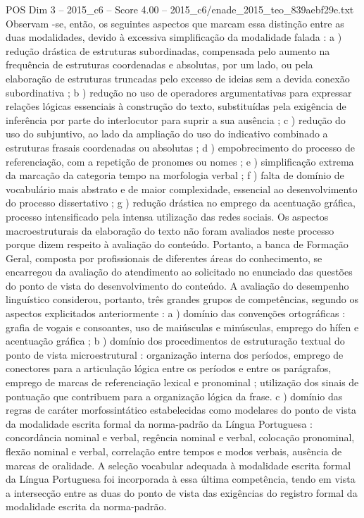 \begin{textsample}{POS Dim 3 – 2015\_c6 – Score 4.00 – 2015\_c6/enade\_2015\_teo\_839aebf29e.txt}
Observam -se, então, os seguintes aspectos que marcam essa distinção entre as duas modalidades, devido à excessiva simplificação da modalidade falada : a ) redução drástica de estruturas subordinadas, compensada pelo aumento na frequência de estruturas coordenadas e absolutas, por um lado, ou pela elaboração de estruturas truncadas pelo excesso de ideias sem a devida conexão subordinativa ; b ) redução no uso de operadores argumentativas para expressar relações lógicas essenciais à construção do texto, substituídas pela exigência de inferência por parte do interlocutor para suprir a sua ausência ; c ) redução do uso do subjuntivo, ao lado da ampliação do uso do indicativo combinado a estruturas frasais coordenadas ou absolutas ; d ) empobrecimento do processo de referenciação, com a repetição de pronomes ou nomes ; e ) simplificação extrema da marcação da categoria tempo na morfologia verbal ; f ) falta de domínio de vocabulário mais abstrato e de maior complexidade, essencial ao desenvolvimento do processo dissertativo ; g ) redução drástica no emprego da acentuação gráfica, processo intensificado pela intensa utilização das redes sociais.
Os aspectos macroestruturais da elaboração do texto não foram avaliados neste processo porque dizem respeito à avaliação do conteúdo.
Portanto, a banca de Formação Geral, composta por profissionais de diferentes áreas do conhecimento, se encarregou da avaliação do atendimento ao solicitado no enunciado das questões do ponto de vista do desenvolvimento do conteúdo.
A avaliação do desempenho linguístico considerou, portanto, três grandes grupos de competências, segundo os aspectos explicitados anteriormente : a ) domínio das convenções ortográficas : grafia de vogais e consoantes, uso de maiúsculas e minúsculas, emprego do hífen e acentuação gráfica ; b ) domínio dos procedimentos de estruturação textual do ponto de vista microestrutural : organização interna dos períodos, emprego de conectores para a articulação lógica entre os períodos e entre os parágrafos, emprego de marcas de referenciação lexical e pronominal ; utilização dos sinais de pontuação que contribuem para a organização lógica da frase. c ) domínio das regras de caráter morfossintático estabelecidas como modelares do ponto de vista da modalidade escrita formal da norma-padrão da Língua Portuguesa : concordância nominal e verbal, regência nominal e verbal, colocação pronominal, flexão nominal e verbal, correlação entre tempos e modos verbais, ausência de marcas de oralidade.
A seleção vocabular adequada à modalidade escrita formal da Língua Portuguesa foi incorporada à essa última competência, tendo em vista a intersecção entre as duas do ponto de vista das exigências do registro formal da modalidade escrita da norma-padrão.

\end{textsample}
